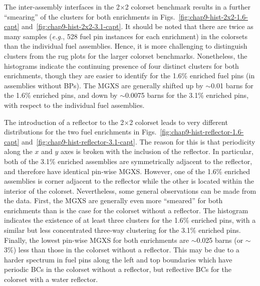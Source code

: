 The inter-assembly interfaces in the 2$\times$2 colorset benchmark results in a further ``smearing'' of the clusters for both enrichments in Figs.~\ref{fig:chap9-hist-2x2-1.6-capt} and~\ref{fig:chap9-hist-2x2-3.1-capt}. It should be noted that there are twice as many samples (\textit{e.g.}, 528 fuel pin instances for each enrichment) in the colorsets than the individual fuel assemblies. Hence, it is more challenging to distinguish clusters from the rug plots for the larger colorset benchmarks. Nonetheless, the histograms indicate the continuing presence of four distinct clusters for both enrichments, though they are easier to identify for the 1.6\% enriched fuel pins (in assemblies without \acp{BP}). The \ac{MGXS} are generally shifted up by $\sim$0.01 barns for the 1.6\% enriched pins, and down by $\sim$0.0075 barns for the 3.1\% enriched pins, with respect to the individual fuel assemblies.

The introduction of a reflector to the 2$\times$2 colorset leads to very different distributions for the two fuel enrichments in Figs.~\ref{fig:chap9-hist-reflector-1.6-capt} and~\ref{fig:chap9-hist-reflector-3.1-capt}. The reason for this is that periodicity along the $x$ and $y$ axes is broken with the inclusion of the reflector. In particular, both of the 3.1\% enriched assemblies are symmetrically adjacent to the reflector, and therefore have identical pin-wise \ac{MGXS}. However, one of the 1.6\% enriched assemblies is corner adjacent to the reflector while the other is located within the interior of the colorset. Nevertheless, some general observations can be made from the data. First, the \ac{MGXS} are generally even more ``smeared'' for both enrichments than is the case for the colorset without a reflector. The histogram indicates the existence of at least three clusters for the 1.6\% enriched pins, with a similar but less concentrated three-way clustering for the 3.1\% enriched pins. Finally, the lowest pin-wise \ac{MGXS} for both enrichments are $\sim$0.025 barns (or $\sim$3\%) less than those in the colorset without a reflector. This may be due to a harder spectrum in fuel pins along the left and top boundaries which have periodic \acp{BC} in the colorset without a reflector, but reflective \acp{BC} for the colorset with a water reflector.


